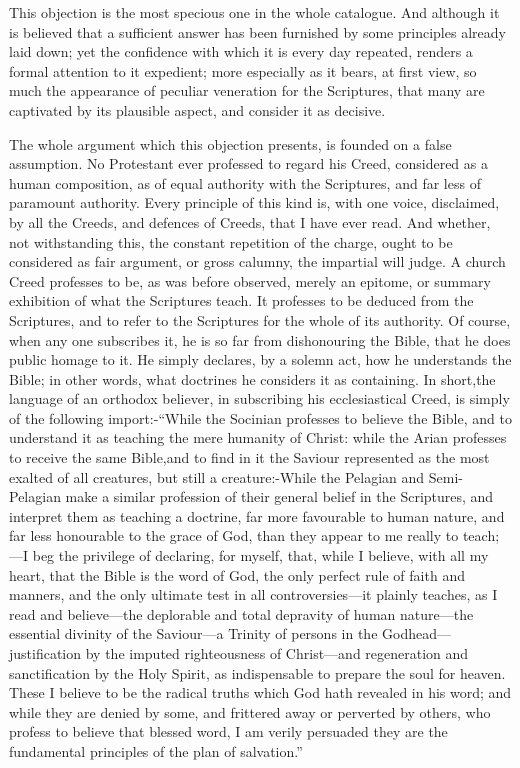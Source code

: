 \documentclass[
]{book}
\begin{document}
This objection is the most specious one in the whole catalogue. And although it is believed that a sufficient answer has been furnished by some principles already laid down; yet the confidence with which it is every day repeated, renders a formal attention to it expedient; more especially as it bears, at first view, so much the appearance of peculiar veneration for the Scriptures, that many are captivated by its plausible aspect, and consider it as decisive.

The whole argument which this objection presents, is founded on a false assumption. No Protestant ever professed to regard his Creed, considered as a human composition, as of equal authority with the Scriptures, and far less of paramount authority. Every principle of this kind is, with one voice, disclaimed, by all the Creeds, and defences of Creeds, that I have ever read. And whether, not withstanding this, the constant repetition of the charge, ought to be considered as fair argument, or gross calumny, the impartial will judge. A church Creed professes to be, as was before observed, merely an epitome, or summary exhibition of what the Scriptures teach. It professes to be deduced from the Scriptures, and to refer to the Scriptures for the whole of its authority. Of course, when any one subscribes it, he is so far from dishonouring the Bible, that he does public homage to it. He simply declares, by a solemn act, how he understands the Bible; in other words, what doctrines he considers it as containing. In short,the language of an orthodox believer, in subscribing his ecclesiastical Creed, is simply of the following import:-``While the Socinian professes to believe the Bible, and to understand it as teaching the mere humanity of Christ: while the Arian professes to receive the same Bible,and to find in it the Saviour represented as the most exalted of all creatures, but still a creature:-While the Pelagian and Semi-Pelagian make a similar profession of their general belief in the Scriptures, and interpret them as teaching a doctrine, far more favourable to human nature, and far less honourable to the grace of God, than they appear to me really to teach;---I beg the privilege of declaring, for myself, that, while I believe, with all my heart, that the Bible is the word of God, the only perfect rule of faith and manners, and the only ultimate test in all controversies---it plainly teaches, as I read and believe---the deplorable and total depravity of human nature---the essential divinity of the Saviour---a Trinity of persons in the Godhead---justification by the imputed righteousness of Christ---and regeneration and sanctification by the Holy Spirit, as indispensable to prepare the soul for heaven. These I believe to be the radical truths which God hath revealed in his word; and while they are denied by some, and frittered away or perverted by others, who profess to believe that blessed word, I am verily persuaded they are the fundamental principles of the plan of salvation.''
\end{document}
